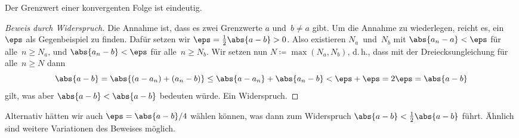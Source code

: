 \documentclass[a4paper]{article}
\begin{document}
\begin{theorem}
    Der Grenzwert einer konvergenten Folge ist eindeutig.
\end{theorem}

\begin{proof}[Beweis durch Widerspruch]
    Die Annahme ist, dass es zwei Grenzwerte $a$ und~$b \neq a$ gibt. Um die Annahme zu wiederlegen, reicht es, ein~$\eps$ als Gegenbeispiel zu finden. Dafür setzen wir $\eps = \frac{1}{2}\abs{a-b} > 0$. Also existieren $N_a$~und~$N_b$ mit $\abs{a_n - a} < \eps$ für alle~$n \geq N_a$, und $\abs{a_n - b} < \eps$ für alle~$n \geq N_b$. Wir setzen nun $N \coloneqq \max(N_a, N_b)$, d.\,h., dass mit der Dreiecksungleichung für alle~$n \geq N$ dann
    \begin{equation*}
        \abs{a-b} = \abs{(a-a_n) + (a_n-b)} \leq \abs{a-a_n} + \abs{a_n-b} < \eps + \eps = 2 \eps = \abs{a-b}
    \end{equation*}
    gilt, was aber $\abs{a-b} < \abs{a-b}$ bedeuten würde. Ein Widerspruch.
\end{proof}

Alternativ hätten wir auch $\eps = \abs{a-b}/4$ wählen können, was dann zum Widerspruch $\abs{a-b} < \frac{1}{2}\abs{a-b}$ führt. Ähnlich sind weitere Variationen des Beweises möglich.
\end{document}
